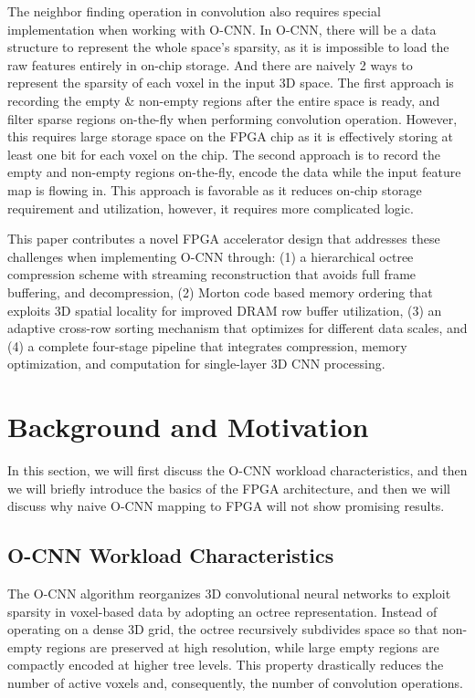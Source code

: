 \documentclass[sigconf, screen]{acmart}
\begin{document}
The neighbor finding operation in convolution also requires special implementation when working with O-CNN. In O-CNN, there will be a data structure to represent the whole space's sparsity, as it is impossible to load the raw features entirely in on-chip storage. And there are naively 2 ways to represent the sparsity of each voxel in the input 3D space. The first approach is recording the empty \& non-empty regions after the entire space is ready, and filter sparse regions on-the-fly when performing convolution operation. However, this requires large storage space on the FPGA chip as it is effectively storing at least one bit for each voxel on the chip. The second approach is to record the empty and non-empty regions on-the-fly, encode the data while the input feature map is flowing in. This approach is favorable as it reduces on-chip storage requirement and utilization, however, it requires more complicated logic.

This paper contributes a novel FPGA accelerator design that addresses these challenges when implementing O-CNN through: (1) a hierarchical octree compression scheme with streaming reconstruction that avoids full frame buffering, and decompression, (2) Morton code based memory ordering that exploits 3D spatial locality for improved DRAM row buffer utilization, (3) an adaptive cross-row sorting mechanism that optimizes for different data scales, and (4) a complete four-stage pipeline that integrates compression, memory optimization, and computation for single-layer 3D CNN processing.

\section{Background and Motivation}
In this section, we will first discuss the O-CNN workload characteristics, and then we will briefly introduce the basics of the FPGA architecture, and then we will discuss why naive O-CNN mapping to FPGA will not show promising results.

\subsection{O-CNN Workload Characteristics}
The O-CNN algorithm reorganizes 3D convolutional neural networks to exploit sparsity in voxel-based data by adopting an octree representation. Instead of operating on a dense 3D grid, the octree recursively subdivides space so that non-empty regions are preserved at high resolution, while large empty regions are compactly encoded at higher tree levels. This property drastically reduces the number of active voxels and, consequently, the number of convolution operations. 
\end{document}
